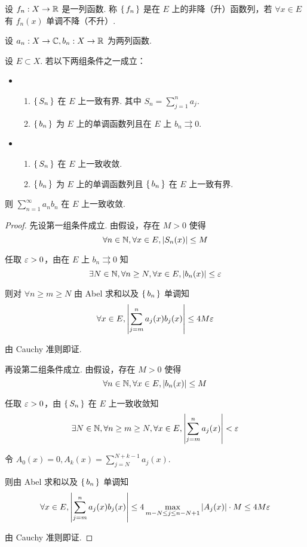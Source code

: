 \begin{definition}
    设 $f_n:X\to\mathbb{R}$ 是一列函数. 称 $\set{f_n}$ 是在 $E$ 上的非降（升）函数列，若 $\forall x\in E$ 有 $f_n(x)$ 单调不降（不升）.
\end{definition}

\begin{theorem}
    设 $a_n:X\to\mathbb{C},b_n:X\to\mathbb{R}$ 为两列函数.

    设 $E\subset X$. 若以下两组条件之一成立：

    \begin{itemize}
        \item \begin{enumerate}
            \item $\set{S_n}$ 在 $E$ 上一致有界. 其中 $S_n=\sum\limits_{j=1}^na_j$.

            \item $\set{b_n}$ 为 $E$ 上的单调函数列且在 $E$ 上 $b_n\rightrightarrows 0$.
        \end{enumerate}

        \item \begin{enumerate}
            \item $\set{S_n}$ 在 $E$ 上一致收敛.

            \item $\set{b_n}$ 为 $E$ 上的单调函数列且 $\set{b_n}$ 在 $E$ 上一致有界.
        \end{enumerate}
    \end{itemize}

    则 $\sum\limits_{n=1}^\infty a_nb_n$ 在 $E$ 上一致收敛.
\end{theorem}
\begin{proof}
    先设第一组条件成立. 由假设，存在 $M>0$ 使得
$$
\forall n\in\mathbb{N},\forall x\in E,\left\lvert{S_n(x)}\right\rvert\le M
$$

    任取 $\varepsilon>0$，由在 $E$ 上 $b_n\rightrightarrows 0$ 知
$$
\exists N\in\mathbb{N},\forall n\ge N,\forall x\in E,\left\lvert{b_n(x)}\right\rvert\le\varepsilon
$$

    则对 $\forall n\ge m\ge N$ 由 Abel 求和以及 $\set{b_n}$ 单调知
$$
\forall x\in E,\left\lvert{\sum_{j=m}^na_j(x)b_j(x)}\right\rvert\le 4M\varepsilon
$$

    由 Cauchy 准则即证.

    再设第二组条件成立. 由假设，存在 $M>0$ 使得
$$
\forall n\in\mathbb{N},\forall x\in E,\left\lvert{b_n(x)}\right\rvert\le M
$$

    任取 $\varepsilon>0$，由 $\set{S_n}$ 在 $E$ 上一致收敛知
$$
\exists N\in\mathbb{N},\forall n\ge m\ge N,\forall x\in E,\left\lvert{\sum_{j=m}^na_j(x)}\right\rvert<\varepsilon
$$

    令 $A_0(x)=0,A_k(x)=\sum\limits_{j=N}^{N+k-1}a_j(x)$.

    则由 Abel 求和以及 $\set{b_n}$ 单调知
$$
\forall x\in E,\left\lvert{\sum_{j=m}^na_j(x)b_j(x)}\right\rvert\le 4\max_{m-N\le j\le n-N+1}\left\lvert{A_j(x)}\right\rvert\cdot M\le 4M\varepsilon
$$

    由 Cauchy 准则即证.
\end{proof}


